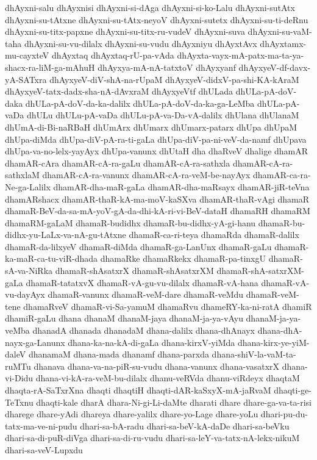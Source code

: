 {dhAyxni-salu
dhAyxnisi
dhAyxni-si-dAga
dhAyxni-si-ko-Lalu
dhAyxni-sutAtx
dhAyxni-su-tAtxne
dhAyxni-su-tAtx-neyoV
dhAyxni-sutetx
dhAyxni-su-ti-deRnu
dhAyxni-su-titx-papxne
dhAyxni-su-titx-ru-vudeV
dhAyxni-suva
dhAyxni-su-vaM-taha
dhAyxni-su-vu-dilalx
dhAyxni-su-vudu
dhAyxniyu
dhAyxtAvx
dhAyxtamx-mu-cayxteV
dhAyxtaq
dhAyxtaq-rU-pa-vAda
dhAyxta-vayx-mA-patx-ma-ta-ya-shacx-ra-liM-ga-mAhuH
dhAyxya-mA-nA-tatxtoV
dhAyxyanf
dhAyxyeV-df-davx-yA-SATxra
dhAyxyeV-diV-shA-na-rUpaM
dhAyxyeV-didxV-pa-shi-KA-kAraM
dhAyxyeV-tatx-dadx-sha-nA-dAvxraM
dhAyxyeVtf
dhULada
dhULa-pA-doV-daka
dhULa-pA-doV-da-ka-dalilx
dhULa-pA-doV-da-ka-ga-LeMba
dhULa-pA-vaDa
dhULu
dhULu-pA-vaDa
dhULu-pA-va-Da-vA-dalilx
dhUlana
dhUlanaM
dhUmA-di-Bi-naRBaH
dhUmArx
dhUmarx
dhUmarx-patarx
dhUpa
dhUpaM
dhUpa-diMda
dhUpa-diV-pA-ra-ti-gaLa
dhUpa-diV-pa-ni-veV-da-namf
dhUpava
dhUpa-va-no-lelx-yayAyx
dhUpa-vanunx
dhUtaH
dha
dhaRveV
dhalige
dhamAR
dhamAR-cAra
dhamAR-cA-ra-gaLu
dhamAR-cA-ra-sathxla
dhamAR-cA-ra-sathxlaM
dhamAR-cA-ra-vanunx
dhamAR-cA-ra-veM-be-nayAyx
dhamAR-ca-ra-Ne-ga-Lalilx
dhamAR-dha-maR-gaLa
dhamAR-dha-maRsayx
dhamAR-jiR-teVna
dhamARshacx
dhamAR-thaR-kA-ma-moV-kaSXva
dhamAR-thaR-vAgi
dhamaR
dhamaR-BeV-da-sa-mA-yoV-gA-da-dhi-kA-ri-vi-BeV-dataH
dhamaRH
dhamaRM
dhamaRM-gaLaM
dhamaR-budidhx
dhamaR-bu-didhx-yA-gi-hanu
dhamaR-bu-didhx-yu-LaLx-va-nA-gu-tAtxne
dhamaR-ca-ri-teya
dhamaRda
dhamaR-dalilx
dhamaR-da-lilxyeV
dhamaR-diMda
dhamaR-ga-LanUnx
dhamaR-gaLu
dhamaR-ka-maR-ca-tu-viR-dhada
dhamaRke
dhamaRkekx
dhamaR-pa-tinxgU
dhamaR-sA-va-NiRka
dhamaR-shAsatxrX
dhamaR-shAsatxrXM
dhamaR-shA-satxrXM-gaLa
dhamaR-tatatxvX
dhamaR-vA-gu-vu-dilalx
dhamaR-vA-hana
dhamaR-vA-vu-dayAyx
dhamaR-vanunx
dhamaR-veM-dare
dhamaR-veMdu
dhamaR-veM-tene
dhamaRveV
dhamaR-vi-Sa-yamuM
dhamaRvu
dhameRY-ka-ni-ratA
dhamiR
dhamiR-gaLu
dhana
dhanaM
dhanaM-jaya
dhanaM-ja-ya-vAyu
dhanaM-ja-ya-veMba
dhanadA
dhanada
dhanadaM
dhana-dalilx
dhana-dhAnayx
dhana-dhA-nayx-ga-Lanunx
dhana-ka-na-kA-di-gaLa
dhana-kirxV-yiMda
dhana-kirx-ye-yiM-daleV
dhanamaM
dhana-mada
dhanamf
dhana-parxda
dhana-shiV-la-vaM-ta-ruMTu
dhanava
dhana-va-na-piR-su-vudu
dhana-vanunx
dhana-vasatxrX
dhana-vi-Didu
dhana-vi-kA-ra-veM-bu-dilalx
dhanu-veRVda
dhanu-viRdeyx
dhaqtaM
dhaqta-rA-SaTxrXna
dhaqti
dhaqtiH
dhaqti-dAR-kaSxyX-mA-jaRvaM
dhaqti-ge-TeTxnu
dhaqti-kale
dharA
dhara-Ni-gi-Li-daMte
dharati
dhare
dhare-ga-va-ta-risi
dharege
dhare-yAdi
dhareya
dhare-yalilx
dhare-yo-Lage
dhare-yoLu
dhari-pu-du-tatx-ma-ve-ni-pudu
dhari-sa-bA-radu
dhari-sa-beV-kA-daDe
dhari-sa-beVku
dhari-sa-di-puR-diVga
dhari-sa-di-ru-vudu
dhari-sa-leY-va-tatx-nA-lekx-nikuM
dhari-sa-veV-Lupxdu
}
